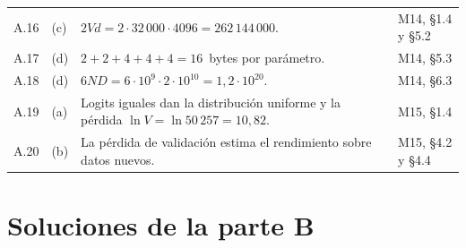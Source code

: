 \begin{table}[H]
\begin{tabularx}{\textwidth}{@{}clX>{\raggedright\arraybackslash}p{1.95cm}@{}}
A.16 & (c) & $2Vd=2\cdot 32\,000\cdot 4096=262\,144\,000$. & M14, §1.4 y §5.2 \\
A.17 & (d) & $2+2+4+4+4=16$~bytes por parámetro. & M14, §5.3 \\
A.18 & (d) & $6ND=6\cdot 10^{9}\cdot 2\cdot 10^{10}=1{,}2\cdot 10^{20}$. & M14, §6.3 \\
A.19 & (a) & Logits iguales dan la distribución uniforme y la pérdida $\ln V=\ln 50\,257=10{,}82$. & M15, §1.4 \\
A.20 & (b) & La pérdida de validación estima el rendimiento sobre datos nuevos. & M15, §4.2 y §4.4 \\
\bottomrule
\end{tabularx}
\end{table}

\section{Soluciones de la parte B}


